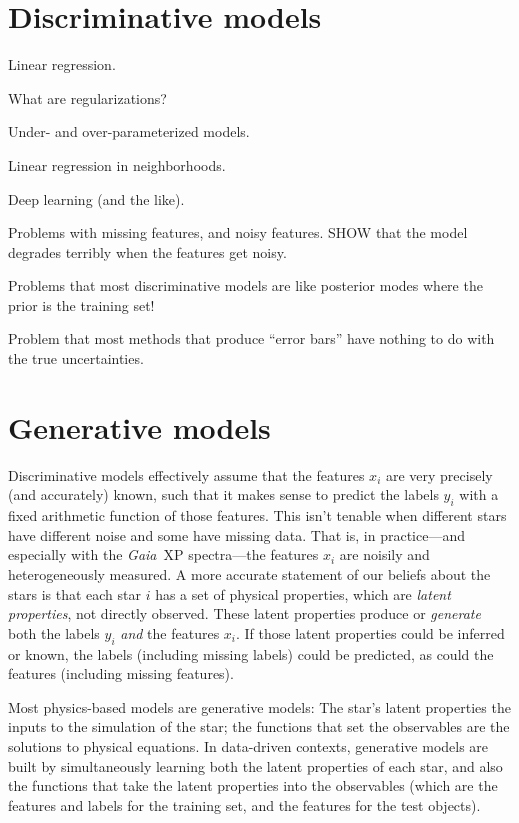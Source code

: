 \documentclass[modern]{aastex631}
\newcommand{\project}[1]{\textsl{#1}}
\newcommand{\Gaia}{\project{Gaia}}
\begin{document}
\section{Discriminative models}

Linear regression.

What are regularizations?

Under- and over-parameterized models.

Linear regression in neighborhoods.

Deep learning (and the like).

Problems with missing features, and noisy features. SHOW that the model degrades terribly when the features get noisy.

Problems that most discriminative models are like posterior modes where the prior is the training set!

Problem that most methods that produce ``error bars'' have nothing to do with the true uncertainties.

\section{Generative models}

Discriminative models effectively assume that the features $x_i$ are very precisely (and accurately) known, such that it makes sense to predict the labels $y_i$ with a fixed arithmetic function of those features.
This isn't tenable when different stars have different noise and some have missing data.
That is, in practice---and especially with the \Gaia\ XP spectra---the features $x_i$ are noisily and heterogeneously measured.
A more accurate statement of our beliefs about the stars is that each star $i$ has a set of physical properties, which are \emph{latent properties}, not directly observed.
These latent properties produce or \emph{generate} both the labels $y_i$ \emph{and} the features $x_i$.
If those latent properties could be inferred or known, the labels (including missing labels) could be predicted, as could the features (including missing features).

Most physics-based models are generative models:
The star's latent properties the inputs to the simulation of the star; the functions that set the observables are the solutions to physical equations.
In data-driven contexts, generative models are built by simultaneously learning both the latent properties of each star, and also the functions that take the latent properties into the observables (which are the features and labels for the training set, and the features for the test objects).
\end{document}
